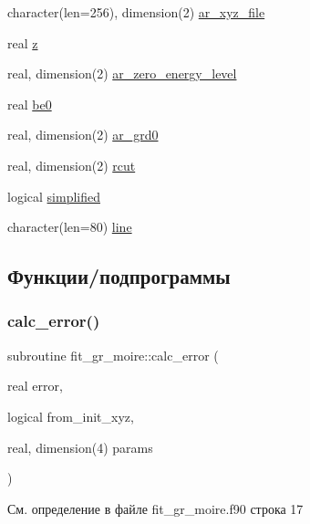 \begin{DoxyCompactItemize}
\item 
character(len=256), dimension(2) \mbox{\hyperlink{namespacefit__gr__moire_adcea9b8af6d606b09d4cf11353d6e76a}{ar\+\_\+xyz\+\_\+file}}
\item 
real \mbox{\hyperlink{namespacefit__gr__moire_ad1616f835d2564c00ebea11a9c88cbaf}{z}}
\item 
real, dimension(2) \mbox{\hyperlink{namespacefit__gr__moire_a7b9059147432f1a2fab23cc7a14bda96}{ar\+\_\+zero\+\_\+energy\+\_\+level}}
\item 
real \mbox{\hyperlink{namespacefit__gr__moire_a9f35bc32182cc551fabbd2a3a172d812}{be0}}
\item 
real, dimension(2) \mbox{\hyperlink{namespacefit__gr__moire_a133d6649efb184d364f20a02e2afd05f}{ar\+\_\+grd0}}
\item 
real, dimension(2) \mbox{\hyperlink{namespacefit__gr__moire_aa4a0f3a112959e7b4ce4105b57b1ac8b}{rcut}}
\item 
logical \mbox{\hyperlink{namespacefit__gr__moire_a9092ed380be5233a800406322be81218}{simplified}}
\item 
character(len=80) \mbox{\hyperlink{namespacefit__gr__moire_a8fbbcfd1d9c1149a9182a782550ea455}{line}}
\end{DoxyCompactItemize}


\subsection{Функции/подпрограммы}
\mbox{\label{namespacefit__gr__moire_aafdddfaa3c2b90a3ab2c09735bc5068b}} 
\subsubsection{\texorpdfstring{calc\+\_\+error()}{calc\_error()}}
{\footnotesize\ttfamily subroutine fit\+\_\+gr\+\_\+moire\+::calc\+\_\+error (\begin{DoxyParamCaption}\item[{real}]{error,  }\item[{logical}]{from\+\_\+init\+\_\+xyz,  }\item[{real, dimension(4)}]{params }\end{DoxyParamCaption})}



См. определение в файле fit\+\_\+gr\+\_\+moire.\+f90 строка 17


